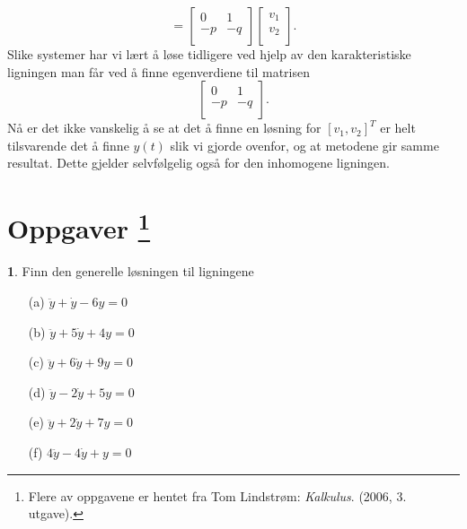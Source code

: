 \documentclass{article}
\theoremstyle{definition}
\newtheorem{oppg}{}
\theoremstyle{remark}
\begin{document}
\begin{multicols*}{2}
\begin{equation*}
  =
  \begin{bmatrix}
    0 & 1 \\
    -p & -q \\
  \end{bmatrix}
  \begin{bmatrix}
    v_1 \\
    v_2 \\
  \end{bmatrix}.
\end{equation*}
Slike systemer har vi lært å løse tidligere ved hjelp av den karakteristiske ligningen man får ved å finne egenverdiene til matrisen
\begin{equation*}
  \begin{bmatrix}
    0 & 1 \\
    -p & -q \\
  \end{bmatrix}.
\end{equation*}
Nå er det ikke vanskelig å se at det å finne en løsning for $[v_1, v_2]^{T}$ er helt tilsvarende det å finne $y(t)$ slik vi gjorde ovenfor, og at metodene gir samme resultat. Dette gjelder selvfølgelig også for den inhomogene ligningen.

\newpage

\section*{Oppgaver \footnote{Flere av oppgavene er hentet fra Tom Lindstrøm: \textit{Kalkulus}. (2006, 3. utgave).}}

\begin{oppg}
  Finn den generelle løsningen til ligningene
  \begin{multicols*}{2}
    \begin{itemize}
      \item[(a)] $\ddot{y} + \dot{y} - 6 y = 0$
      \item[(b)] $\ddot{y} + 5\dot{y} + 4y = 0$
      \item[(c)] $\ddot{y} + 6\dot{y} + 9y = 0$
      \item[(d)] $\ddot{y} - 2\dot{y} + 5y = 0$
      \item[(e)] $\ddot{y} + 2\dot{y} + 7y = 0$
      \item[(f)] $4\ddot{y} - 4\dot{y} + y = 0$  
    \end{itemize}
  \end{multicols*}
\end{oppg}


\end{multicols*}
\end{document}
